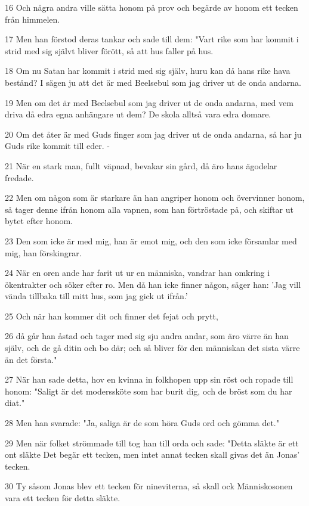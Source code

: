 \par 16 Och några andra ville sätta honom på prov och begärde av honom ett tecken från himmelen.
\par 17 Men han förstod deras tankar och sade till dem: "Vart rike som har kommit i strid med sig självt bliver förött, så att hus faller på hus.
\par 18 Om nu Satan har kommit i strid med sig själv, huru kan då hans rike hava bestånd? I sägen ju att det är med Beelsebul som jag driver ut de onda andarna.
\par 19 Men om det är med Beelsebul som jag driver ut de onda andarna, med vem driva då edra egna anhängare ut dem? De skola alltså vara edra domare.
\par 20 Om det åter är med Guds finger som jag driver ut de onda andarna, så har ju Guds rike kommit till eder. -
\par 21 När en stark man, fullt väpnad, bevakar sin gård, då äro hans ägodelar fredade.
\par 22 Men om någon som är starkare än han angriper honom och övervinner honom, så tager denne ifrån honom alla vapnen, som han förtröstade på, och skiftar ut bytet efter honom.
\par 23 Den som icke är med mig, han är emot mig, och den som icke församlar med mig, han förskingrar.
\par 24 När en oren ande har farit ut ur en människa, vandrar han omkring i ökentrakter och söker efter ro. Men då han icke finner någon, säger han: 'Jag vill vända tillbaka till mitt hus, som jag gick ut ifrån.'
\par 25 Och när han kommer dit och finner det fejat och prytt,
\par 26 då går han åstad och tager med sig sju andra andar, som äro värre än han själv, och de gå ditin och bo där; och så bliver för den människan det sista värre än det första."
\par 27 När han sade detta, hov en kvinna in folkhopen upp sin röst och ropade till honom: "Saligt är det moderssköte som har burit dig, och de bröst som du har diat."
\par 28 Men han svarade: "Ja, saliga är de som höra Guds ord och gömma det."
\par 29 Men när folket strömmade till tog han till orda och sade: "Detta släkte är ett ont släkte Det begär ett tecken, men intet annat tecken skall givas det än Jonas' tecken.
\par 30 Ty såsom Jonas blev ett tecken för nineviterna, så skall ock Människosonen vara ett tecken för detta släkte.

